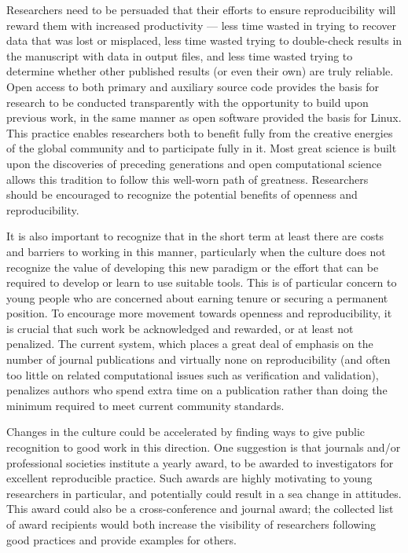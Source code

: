 \documentclass[11pt]{article}
\begin{document}
Researchers need to be persuaded that their efforts to ensure
reproducibility will reward them with increased productivity --- less time
wasted in trying to recover data that was lost or misplaced, less time
wasted trying to double-check results in the manuscript with data in output
files, and less time wasted trying to determine whether other published
results (or even their own) are truly reliable.  Open access to both primary
and auxiliary source code provides the basis for research to be conducted
transparently with the opportunity to build upon previous work, in the same
manner as open software provided the basis for Linux.  This practice enables
researchers both to benefit fully from the creative energies of the global
community and to participate fully in it.  Most great science is built upon
the discoveries of preceding generations and open computational science
allows this tradition to follow this well-worn path of greatness.  
Researchers should be encouraged to recognize the potential benefits of
openness and reproducibility.

It is also important to recognize that in the short term at least there are
costs and barriers to working in this manner, particularly when the culture
does not recognize the value of developing this new paradigm or the effort
that can be required to develop or learn to use suitable tools.
This is of particular concern to young people who are concerned about
earning tenure or securing a permanent position.   To encourage more movement
towards openness and reproducibility, it is crucial that such work be
acknowledged and rewarded, or at least not penalized.  The current system,
which places a great deal of emphasis on the number of journal publications 
and virtually none on reproducibility (and often too little on 
related computational issues such as verification and validation), penalizes
authors who spend extra time on a publication rather than doing the minimum
required to meet current community standards.  

Changes in the culture could be accelerated by finding ways to give public
recognition to good work in this direction.  
One suggestion is that journals and/or professional societies institute a
yearly award, to be awarded to investigators for excellent reproducible
practice.  Such awards are highly motivating to young researchers in
particular, and potentially could result in a sea change in attitudes. This
award could also be a cross-conference and journal award; the collected list
of award recipients would both increase the visibility of researchers
following good practices and provide examples for others.
\end{document}
